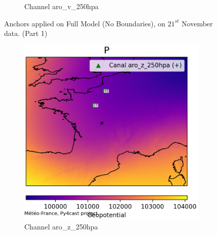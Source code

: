 \begin{figure}[h]
\begin{subfigure}[b]{0.44\textwidth}
        \caption{Channel aro\_v\_250hpa}
    \end{subfigure}
    \caption{Anchors applied on Full Model (No Boundaries), on $21^{st}$ November data. (Part 1)}
\end{figure}

\begin{figure}[h]
    \ContinuedFloat
    \begin{subfigure}[b]{0.44\textwidth}
        \includegraphics[width=\textwidth]{Images/titan_rain_anchors/nov-21/complete/2023112100_feature_aro_z_250hpa.png}
        \caption{Channel aro\_z\_250hpa}
    \end{subfigure}
    \hfill
    \begin{subfigure}[b]{0.44\textwidth}

\end{subfigure}
\end{figure}

